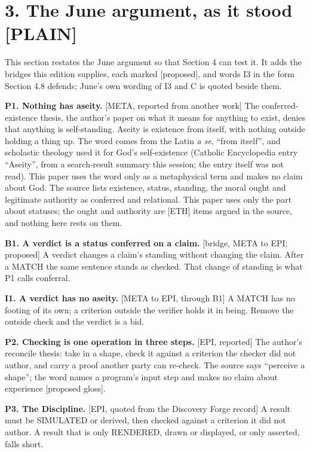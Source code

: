 \documentclass[11pt]{article}
\newcommand{\register}[1]{{\ttfamily\small #1}}
\begin{document}
\section*{3. The June argument, as it stood \register{[PLAIN]}}

This section restates the June argument so that Section 4 can test it. It adds the bridges this edition supplies, each marked [proposed], and words I3 in the form Section 4.8 defends; June's own wording of I3 and C is quoted beside them.

\textbf{P1. Nothing has aseity.} [META, reported from another work] The conferred-existence thesis, the author's paper on what it means for anything to exist, denies that anything is self-standing. Aseity is existence from itself, with nothing outside holding a thing up. The word comes from the Latin \emph{a se}, ``from itself'', and scholastic theology used it for God's self-existence (Catholic Encyclopedia entry ``Aseity'', from a search-result summary this session; the entry itself was not read). This paper uses the word only as a metaphysical term and makes no claim about God. The source lists existence, status, standing, the moral ought and legitimate authority as conferred and relational. This paper uses only the part about statuses; the ought and authority are [ETH] items argued in the source, and nothing here rests on them.

\textbf{B1. A verdict is a status conferred on a claim.} [bridge, META to EPI; proposed] A verdict changes a claim's standing without changing the claim. After a MATCH the same sentence stands as checked. That change of standing is what P1 calls conferral.

\textbf{I1. A verdict has no aseity.} [META to EPI, through B1] A MATCH has no footing of its own; a criterion outside the verifier holds it in being. Remove the outside check and the verdict is a bid.

\textbf{P2. Checking is one operation in three steps.} [EPI, reported] The author's reconcile thesis: take in a shape, check it against a criterion the checker did not author, and carry a proof another party can re-check. The source says ``perceive a shape''; the word names a program's input step and makes no claim about experience [proposed gloss].

\textbf{P3. The Discipline.} [EPI, quoted from the Discovery Forge record] A result must be SIMULATED or derived, then checked against a criterion it did not author. A result that is only RENDERED, drawn or displayed, or only asserted, falls short.
\end{document}
